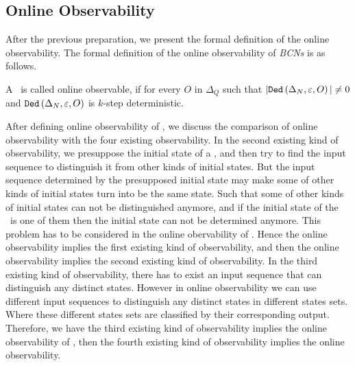 \subsection{Online Observability}
After the previous preparation, we present the formal definition of the online observability. The formal definition of the online observability of {\em BCNs} is as follows.
\begin{definition}
 A \BCN\ is called online observable,
if for every  $O$ in $\Delta_Q$ such that $|{\tt Ded}\left(\Delta_N,\varepsilon, O\right)|\neq 0$ and ${\tt Ded}\left(\Delta_N,\varepsilon,O\right)$ is $k$-step deterministic.
\end{definition}


After defining online observability of \BCNs, we discuss the comparison of online observability with the four existing observability. In the second existing kind of observability, we presuppose the initial state of a \BCN, and then try to find the input sequence to distinguish it from other kinds of initial states. But the input sequence determined by the presupposed initial state may make some of other kinds of initial states turn into be the same state. Such that some of other kinds of initial states can not be distinguished anymore, and if the initial state of the \BCN\ is one of them then the initial state can not be determined anymore. This problem has to be considered in the online obervability of \BCNs. Hence the online observability implies the first existing kind of observability, and then the online observability implies the second existing kind of observability. In the third existing kind of observability, there has to exist an input sequence that can distinguish any distinct states. However in online observability we can use different input sequences to distinguish any distinct states in different states sets. Where these different states sets are classified by their corresponding output. Therefore, we have the third existing kind of observability implies the online observability of \BCNs, then the fourth existing kind of observability implies the online observability.

